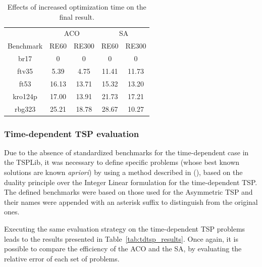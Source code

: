 \documentclass[onecolumn]{elsarticle}
\begin{document}
\begin{table}[t]
\centering
\caption{Effects of increased optimization time on the final result.}
\label{tab:further_opt}
\begin{tabular}{ccccc}
\hline
         & \multicolumn{2}{c}{ACO} & \multicolumn{2}{c}{SA} \\
Benchmark & RE60      & RE300      & RE60       & RE300      \\ \hline
br17     & 0          & 0          & 0         & 0          \\
ftv35    & 5.39       & 4.75           & 11.41     & 11.73      \\
ft53     & 16.13      & 13.71 			& 15.32     & 13.20      \\
kro124p   & 17.00       & 13.91            & 21.73     & 17.21      \\
rbg323   & 25.21      & 18.78            & 28.67     & 10.27      \\
\hline
\end{tabular}
\end{table}


\subsubsection{Time-dependent TSP evaluation}

Due to the absence of standardized benchmarks for the time-dependent case in the TSPLib, it was necessary to define specific problems (whose best known solutions are known \textit{apriori}) by using a method described in (\cite{TDTSP_construction}), based on the duality principle over the Integer Linear formulation for the time-dependent TSP. The defined benchmarks were based on those used for the Asymmetric TSP and their names were appended with an asterisk suffix to distinguish from the original ones.

Executing the same evaluation strategy on the time-dependent TSP problems leads to the results presented in Table~\ref{tab:tdtsp_results}. Once again, it is possible to compare the efficiency of the ACO and the SA, by evaluating the relative error of each set of problems.
\end{document}
